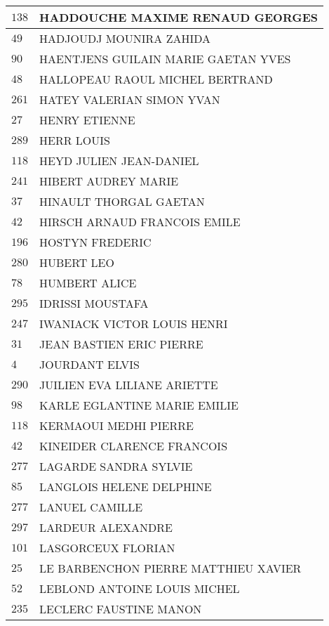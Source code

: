 \begin{xltabular}{\linewidth}{|l|X|}
    \hline
    $138$ & HADDOUCHE MAXIME RENAUD GEORGES \\
    \hline
    $49$ & HADJOUDJ MOUNIRA ZAHIDA \\
    \hline
    $90$ & HAENTJENS GUILAIN MARIE GAETAN YVES \\
    \hline
    $48$ & HALLOPEAU RAOUL MICHEL BERTRAND \\
    \hline
    $261$ & HATEY VALERIAN SIMON YVAN \\
    \hline
    $27$ & HENRY ETIENNE \\
    \hline
    $289$ & HERR LOUIS \\
    \hline
    $118$ & HEYD JULIEN JEAN-DANIEL \\
    \hline
    $241$ & HIBERT AUDREY MARIE \\
    \hline
    $37$ & HINAULT THORGAL GAETAN \\
    \hline
    $42$ & HIRSCH ARNAUD FRANCOIS EMILE \\
    \hline
    $196$ & HOSTYN FREDERIC \\
    \hline
    $280$ & HUBERT LEO \\
    \hline
    $78$ & HUMBERT ALICE \\
    \hline
    $295$ & IDRISSI MOUSTAFA \\
    \hline
    $247$ & IWANIACK VICTOR LOUIS HENRI \\
    \hline
    $31$ & JEAN BASTIEN ERIC PIERRE \\
    \hline
    $4$ & JOURDANT ELVIS \\
    \hline
    $290$ & JUILIEN EVA LILIANE ARIETTE \\
    \hline
    $98$ & KARLE EGLANTINE MARIE EMILIE \\
    \hline
    $118$ & KERMAOUI MEDHI PIERRE \\
    \hline
    $42$ & KINEIDER CLARENCE FRANCOIS \\
    \hline
    $277$ & LAGARDE SANDRA SYLVIE \\
    \hline
    $85$ & LANGLOIS HELENE DELPHINE \\
    \hline
    $277$ & LANUEL CAMILLE \\
    \hline
    $297$ & LARDEUR ALEXANDRE \\
    \hline
    $101$ & LASGORCEUX FLORIAN \\
    \hline
    $25$ & LE BARBENCHON PIERRE MATTHIEU XAVIER \\
    \hline
    $52$ & LEBLOND ANTOINE LOUIS MICHEL \\
    \hline
    $235$ & LECLERC FAUSTINE MANON \\

\end{xltabular}
